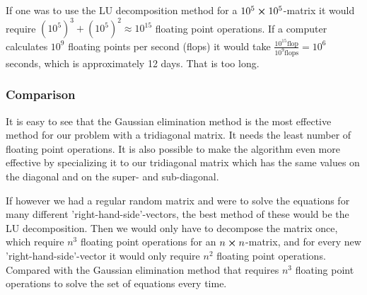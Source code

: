 If one was to use the LU decomposition method for a $10^5 \cross 10^5$-matrix it would require $\left(10^5\right)^3 + \left(10^5\right)^2 \approx 10^{15} $ floating point operations. If a computer calculates $10^9$ floating points per second (flops) it would take $\frac{10^{15}\text{flop}}{10^{9}\text{flops}} = 10^6$ seconds, which is approximately 12 days. That is too long.

\subsubsection{Comparison}

It is easy to see that the Gaussian elimination method is the most effective method for our problem with a tridiagonal matrix. It needs the least number of floating point operations. It is also possible to make the algorithm even more effective by specializing it to our tridiagonal matrix which has the same values on the diagonal and on the super- and sub-diagonal. 

If however we had a regular random matrix and were to solve the equations for many different 'right-hand-side'-vectors, the best method of these would be the LU decomposition. Then we would only have to decompose the matrix once, which require $n^3$ floating point operations for an $n \cross n$-matrix, and for every new 'right-hand-side'-vector it would only require $n^2$ floating point operations. Compared with the Gaussian elimination method that requires $n^3$ floating point operations to solve the set of equations every time.